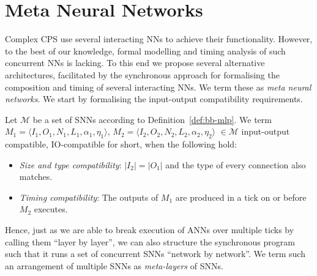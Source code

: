 \section{Meta Neural Networks}
\label{sec:concurrent-sann}


Complex \ac{CPS} use several interacting \acp{NN} to achieve their
functionality. However, to the best of our knowledge, formal modelling
and timing analysis of such concurrent \acp{NN} is lacking. To this
end we propose several alternative architectures, facilitated by the
synchronous approach for formalising the composition and timing of
several interacting \acp{NN}. We term these as \emph{meta neural networks}.
We start by formalising the input-output compatibility requirements.

\begin{definition}
	\label{def:io-compatibility}
	Let $\mathcal{M}$ be a set of \acp{SNN} according to Definition~\ref{def:bb-mlp}.
	We term $M_1 = \langle I_1, O_1, N_1, L_1, \alpha_1, \eta_1 \rangle$, $M_2=\langle I_2, O_2, N_2, L_2, \alpha_2, \eta_2  \rangle$ 
	$\in \mathcal{M}$ input-output compatible,
	IO-compatible for short, when the following hold:
	\begin{itemize}
		\item \emph{Size and type compatibility}: $|I_2|=|O_1|$ and the type of every connection also matches.
		\item \emph{Timing compatibility}: The outputs of $M_1$ are produced in a tick on or before $M_2$
		executes.
	\end{itemize}
\end{definition} 

Hence, just as we are able to break execution of \acp{ANN} over
multiple ticks by calling them 
``layer by layer'', we can also structure the synchronous program such
that it runs a set of concurrent \acp{SNN} ``network by network''.  We term such an arrangement of 
multiple \acp{SNN} as \emph{meta-layers} of \acp{SNN}.

